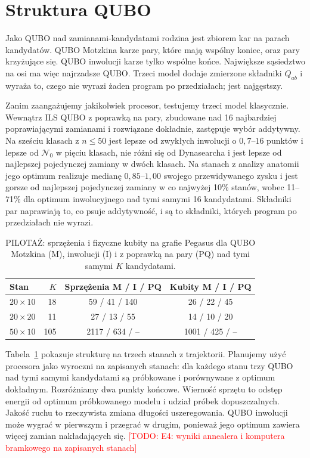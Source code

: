 \documentclass[10pt,twocolumn]{article}
\newcommand{\todo}[1]{\textcolor{red}{[TODO: #1]}}
\newcommand{\N}{\mathcal{N}}
\begin{document}
\section{Struktura QUBO}\label{sec:quantum}

Jako QUBO nad zamianami-kandydatami rodzina jest zbiorem kar na parach
kandydatów. QUBO Motzkina karze pary, które mają wspólny koniec, oraz
pary krzyżujące się. QUBO inwolucji karze tylko wspólne końce. Największe
sąsiedztwo na osi ma więc najrzadsze QUBO. Trzeci model dodaje zmierzone
składniki $Q_{ab}$ i wyraża to, czego nie wyrazi żaden program po
przedziałach; jest najgęstszy.

Zanim zaangażujemy jakikolwiek procesor, testujemy trzeci model
klasycznie. Wewnątrz ILS QUBO z poprawką na pary, zbudowane nad 16
najbardziej poprawiającymi zamianami i rozwiązane dokładnie, zastępuje
wybór addytywny. Na sześciu klasach z $n\leq50$ jest lepsze od zwykłych
inwolucji o $0{,}7$--$16$ punktów i lepsze od $\N_0$ w pięciu klasach, nie
różni się od Dynasearcha i jest lepsze od najlepszej pojedynczej zamiany
w dwóch klasach. Na stanach z analizy anatomii jego optimum realizuje
medianę $0{,}85$--$1{,}00$ swojego przewidywanego zysku i jest gorsze od
najlepszej pojedynczej zamiany w co najwyżej 10\% stanów, wobec 11--71\%
dla optimum inwolucyjnego nad tymi samymi 16 kandydatami. Składniki par
naprawiają to, co psuje addytywność, i są to składniki, których program po
przedziałach nie wyrazi.

\begin{table}[t]
\centering
\caption{PILOTAŻ: sprzężenia i fizyczne kubity na grafie Pegasus dla QUBO
Motzkina (M), inwolucji (I) i z poprawką na pary (PQ) nad tymi samymi $K$
kandydatami.}
\label{tab:qubo}
\small
\begin{tabular}{@{}lrcc@{}}
\toprule
Stan & $K$ & Sprzężenia M / I / PQ & Kubity M / I / PQ \\
\midrule
$20\times10$ & 18 & 59 / 41 / 140 & 26 / 22 / 45 \\
$20\times20$ & 11 & 27 / 13 / 55 & 14 / 10 / 20 \\
$50\times10$ & 105 & 2117 / 634 / -- & 1001 / 425 / -- \\
\bottomrule
\end{tabular}
\end{table}

Tabela~\ref{tab:qubo} pokazuje strukturę na trzech stanach z trajektorii.
Planujemy użyć procesora jako wyroczni na zapisanych stanach: dla każdego
stanu trzy QUBO nad tymi samymi kandydatami są próbkowane i porównywane
z optimum dokładnym. Rozróżniamy dwa punkty końcowe. Wierność sprzętu to
odstęp energii od optimum próbkowanego modelu i udział próbek
dopuszczalnych. Jakość ruchu to rzeczywista zmiana długości uszeregowania.
QUBO inwolucji może wygrać w pierwszym i przegrać w drugim, ponieważ jego
optimum zawiera więcej zamian nakładających się. \todo{E4: wyniki
annealera i komputera bramkowego na zapisanych stanach}
\end{document}
